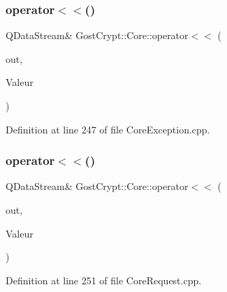 \subsubsection{\texorpdfstring{operator$<$$<$()}{operator<<()}\hspace{0.1cm}{\footnotesize\ttfamily [48/56]}}
{\footnotesize\ttfamily Q\+Data\+Stream\& Gost\+Crypt\+::\+Core\+::operator$<$$<$ (\begin{DoxyParamCaption}\item[{Q\+Data\+Stream \&}]{out,  }\item[{const \hyperlink{class_gost_crypt_1_1_core_1_1_incorrect_sudo_password}{Gost\+Crypt\+::\+Core\+::\+Incorrect\+Sudo\+Password} \&}]{Valeur }\end{DoxyParamCaption})}



Definition at line 247 of file Core\+Exception.\+cpp.

\mbox{\label{namespace_gost_crypt_1_1_core_a2156b463d5c1d15655fa2fe205ae9598}} 
\subsubsection{\texorpdfstring{operator$<$$<$()}{operator<<()}\hspace{0.1cm}{\footnotesize\ttfamily [49/56]}}
{\footnotesize\ttfamily Q\+Data\+Stream\& Gost\+Crypt\+::\+Core\+::operator$<$$<$ (\begin{DoxyParamCaption}\item[{Q\+Data\+Stream \&}]{out,  }\item[{const \hyperlink{struct_gost_crypt_1_1_core_1_1_progress_tracking_parameters}{Progress\+Tracking\+Parameters} \&}]{Valeur }\end{DoxyParamCaption})}



Definition at line 251 of file Core\+Request.\+cpp.

\mbox{\label{namespace_gost_crypt_1_1_core_aebe7e5d89d4f30fe269355cbec216c97}} 
